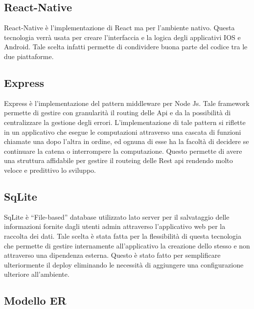 \subsection{React-Native}\vspace{5mm}

	React-Native è l'implementazione di React ma per l’ambiente nativo. Questa tecnologia verrà usata per creare l’interfaccia e la logica degli applicativi IOS e Android. Tale scelta infatti permette di condividere buona parte del codice tra le due piattaforme.\vspace{5mm}

\subsection{Express}\vspace{5mm}

	Express è l'implementazione del pattern middleware per Node Js. Tale framework permette di gestire con granularità il routing delle Api e da la possibilità di centralizzare la gestione degli errori. L'implementazione di tale pattern si riflette in un applicativo che esegue le computazioni attraverso una cascata di funzioni chiamate una dopo l'altra in ordine, ed ognuna di esse ha la facoltà di decidere se continuare la catena o interrompere la computazione. Questo permette di avere una struttura affidabile per gestire il routeing delle Rest api rendendo molto veloce e predittivo lo sviluppo.\vspace{5mm}

\subsection{SqLite}\vspace{5mm}

	SqLite è “File-based” database utilizzato lato server per il salvataggio delle informazioni fornite dagli utenti admin attraverso l’applicativo web per la raccolta dei dati. Tale scelta è stata fatta per la flessibilità di questa tecnologia che permette di gestire internamente all’applicativo la creazione dello stesso e non attraverso una dipendenza esterna. Questo è stato fatto per semplificare ulteriormente il deploy eliminando le necessità di aggiungere una configurazione ulteriore all’ambiente.\vspace{5mm}
	
	\subsection{Modello ER}\vspace{5mm}

